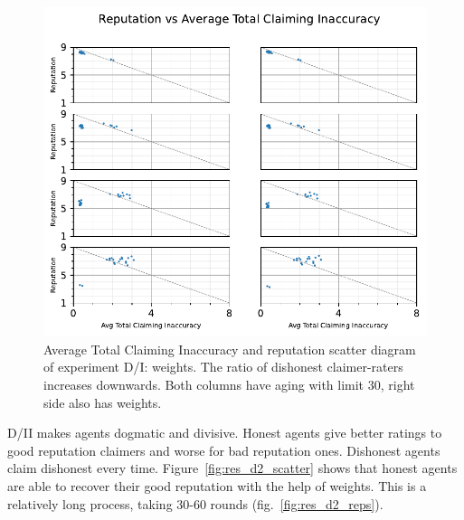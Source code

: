 \documentclass[%
    ]{\PathToTumTemplate/thesis/tum_thesis}
\begin{document}
\begin{figure}[tbp]
  \begin{center}
        \includegraphics[width=0.75\linewidth]	{../results/d/AvgTotClaimInaccuracyAndReputationScatter_joined.pdf}
    \caption{
    Average Total Claiming Inaccuracy and reputation scatter diagram of experiment D/I: weights.
    The ratio of dishonest claimer-raters increases downwards.
    Both columns have aging with limit 30, right side also has weights.
    }
    \label{fig:res_d_scatter}
  \end{center}
\end{figure}

D/II makes agents dogmatic and divisive.
Honest agents give better ratings to good reputation claimers and worse for bad reputation ones.
Dishonest agents claim dishonest every time.
Figure~\ref{fig:res_d2_scatter} shows that honest agents are able to recover their good reputation with the help of weights.
This is a relatively long process, taking 30-60 rounds (fig.~\ref{fig:res_d2_reps}).
\end{document}

